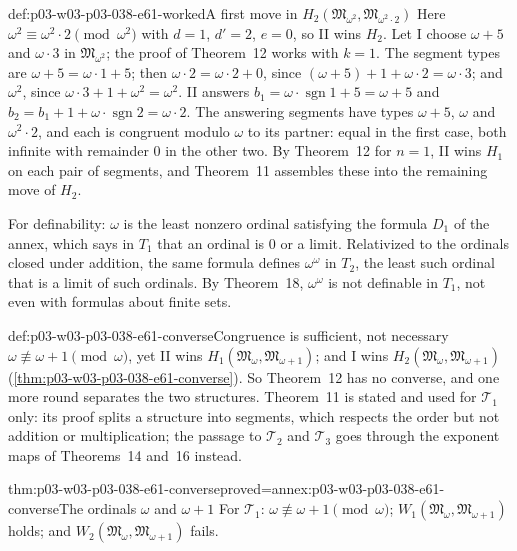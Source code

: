 \begin{hbexample}{def:p03-w03-p03-038-e61-worked}{A first move in \(H_2(\mathfrak M_{\omega^2},\mathfrak M_{\omega^2\cdot2})\)}
Here \(\omega^2\equiv\omega^2\cdot2\pmod{\omega^2}\) with \(d=1\),
\(d'=2\), \(e=0\), so II wins \(H_2\). Let I choose \(\omega+5\) and
\(\omega\cdot3\) in \(\mathfrak M_{\omega^2}\); the proof of Theorem~12
works with \(k=1\). The segment types are \(\omega+5=\omega\cdot1+5\);
then \(\omega\cdot2=\omega\cdot2+0\), since
\((\omega+5)+1+\omega\cdot2=\omega\cdot3\); and \(\omega^2\), since
\(\omega\cdot3+1+\omega^2=\omega^2\). II answers
\(b_1=\omega\cdot\operatorname{sgn}1+5=\omega+5\) and
\(b_2=b_1+1+\omega\cdot\operatorname{sgn}2=\omega\cdot2\). The answering
segments have types \(\omega+5\), \(\omega\) and \(\omega^2\cdot2\), and
each is congruent modulo \(\omega\) to its partner: equal in the first
case, both infinite with remainder \(0\) in the other two. By
Theorem~12 for \(n=1\), II wins \(H_1\) on each pair of segments, and
Theorem~11 assembles these into the remaining move of \(H_2\).

For definability: \(\omega\) is the least nonzero ordinal satisfying the
formula \(D_1\) of the annex, which says in \(T_1\) that an ordinal is
\(0\) or a limit.
Relativized to the ordinals closed under addition, the same formula
defines \(\omega^\omega\) in \(T_2\), the least such ordinal that is a
limit of such ordinals. By Theorem~18, \(\omega^\omega\) is not definable
in \(T_1\), not even with formulas about finite sets.
\end{hbexample}

\begin{hbwarning}{def:p03-w03-p03-038-e61-converse}{Congruence is sufficient, not necessary}
\(\omega\not\equiv\omega+1\pmod\omega\), yet II wins
\(H_1(\mathfrak M_\omega,\mathfrak M_{\omega+1})\); and I wins
\(H_2(\mathfrak M_\omega,\mathfrak M_{\omega+1})\)
(\cref{thm:p03-w03-p03-038-e61-converse}). So Theorem~12 has no converse,
and one more round separates the two structures. Theorem~11 is stated
and used for \(\mathcal T_1\) only: its proof splits a structure into
segments, which respects the order but not addition or multiplication;
the passage to \(\mathcal T_2\) and \(\mathcal T_3\) goes through the
exponent maps of Theorems~14 and~16 instead.
\end{hbwarning}

\begin{hblemma}{thm:p03-w03-p03-038-e61-converse}{proved=annex:p03-w03-p03-038-e61-converse}{The ordinals \(\omega\) and \(\omega+1\)}
For \(\mathcal T_1\): \(\omega\not\equiv\omega+1\pmod\omega\);
\(W_1(\mathfrak M_\omega,\mathfrak M_{\omega+1})\) holds; and
\(W_2(\mathfrak M_\omega,\mathfrak M_{\omega+1})\) fails.
\end{hblemma}

